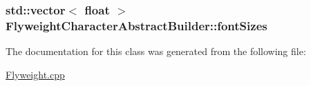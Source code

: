 \subsubsection[{\texorpdfstring{font\+Sizes}{fontSizes}}]{\setlength{\rightskip}{0pt plus 5cm}std\+::vector$<$ float $>$ Flyweight\+Character\+Abstract\+Builder\+::font\+Sizes\hspace{0.3cm}{\ttfamily [static]}}\hypertarget{classFlyweightCharacterAbstractBuilder_ad218358c55dae716e3ac08f453e5ab0a}{}\label{classFlyweightCharacterAbstractBuilder_ad218358c55dae716e3ac08f453e5ab0a}


The documentation for this class was generated from the following file\+:\begin{DoxyCompactItemize}
\item 
\hyperlink{Flyweight_8cpp}{Flyweight.\+cpp}\end{DoxyCompactItemize}
